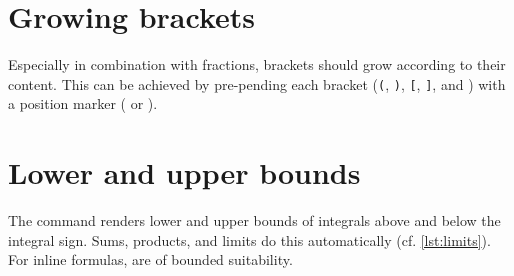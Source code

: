 \begin{table}[H]
\end{table}

\section{Growing brackets}

Especially in combination with fractions, brackets should grow according to their content.
This can be achieved by pre-pending each bracket (\texttt{(}, \texttt{)}, \texttt{[}, \texttt{]}, \texttt{\lbrace} and \texttt{\rbrace}) with a position marker (\texttt{\left} or \texttt{\right}).


\section{Lower and upper bounds}

The \texttt{\limits} command renders lower and upper bounds of integrals above and below the integral sign.
Sums, products, and limits do this 
automatically (cf. \cref{lst:limits}).
For inline formulas, \texttt{\limits} are of bounded suitability.

